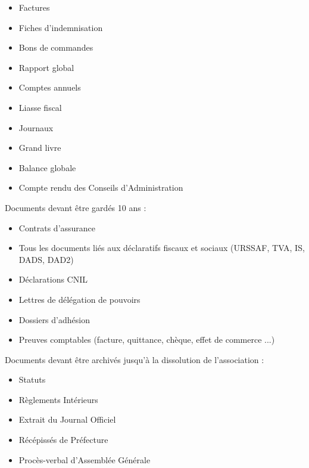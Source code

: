 \documentclass[12pt]{article}
\begin{document}
\begin{itemize}
    \item Factures
    \item Fiches d’indemnisation
    \item Bons de commandes
    \item Rapport global
    \item Comptes annuels
    \item Liasse fiscal
    \item Journaux
    \item Grand livre
    \item Balance globale
    \item Compte rendu des Conseils d’Administration
\end{itemize}


Documents devant être gardés 10 ans :

\begin{itemize}
    \item Contrats d’assurance
    \item Tous les documents liés aux déclaratifs fiscaux et sociaux (URSSAF, TVA, IS, DADS, DAD2)
    \item Déclarations CNIL
    \item Lettres de délégation de pouvoirs
    \item Dossiers d’adhésion
    \item Preuves comptables (facture, quittance, chèque, effet de commerce ...)
\end{itemize}



Documents devant être archivés jusqu’à la dissolution de l’association :

\begin{itemize}
    \item Statuts
    \item Règlements Intérieurs
    \item Extrait du Journal Officiel
    \item Récépissés de Préfecture
    \item Procès-verbal d’Assemblée Générale
\end{itemize}
\end{document}
